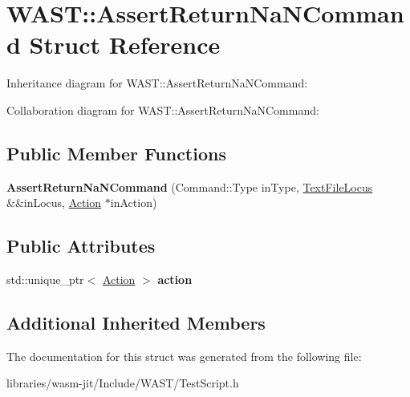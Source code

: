 \hypertarget{struct_w_a_s_t_1_1_assert_return_na_n_command}{}\section{W\+A\+ST\+:\+:Assert\+Return\+Na\+N\+Command Struct Reference}
\label{struct_w_a_s_t_1_1_assert_return_na_n_command}


Inheritance diagram for W\+A\+ST\+:\+:Assert\+Return\+Na\+N\+Command\+:


Collaboration diagram for W\+A\+ST\+:\+:Assert\+Return\+Na\+N\+Command\+:
\subsection*{Public Member Functions}
\begin{DoxyCompactItemize}
\item 
\mbox{\label{struct_w_a_s_t_1_1_assert_return_na_n_command_a892e4128fdac7570abc9f3860c3771b2}} 
{\bfseries Assert\+Return\+Na\+N\+Command} (Command\+::\+Type in\+Type, \mbox{\hyperlink{struct_w_a_s_t_1_1_text_file_locus}{Text\+File\+Locus}} \&\&in\+Locus, \mbox{\hyperlink{struct_w_a_s_t_1_1_action}{Action}} $\ast$in\+Action)
\end{DoxyCompactItemize}
\subsection*{Public Attributes}
\begin{DoxyCompactItemize}
\item 
\mbox{\label{struct_w_a_s_t_1_1_assert_return_na_n_command_a8354f510a073d21311c0be1be5415410}} 
std\+::unique\+\_\+ptr$<$ \mbox{\hyperlink{struct_w_a_s_t_1_1_action}{Action}} $>$ {\bfseries action}
\end{DoxyCompactItemize}
\subsection*{Additional Inherited Members}


The documentation for this struct was generated from the following file\+:\begin{DoxyCompactItemize}
\item 
libraries/wasm-\/jit/\+Include/\+W\+A\+S\+T/Test\+Script.\+h\end{DoxyCompactItemize}
